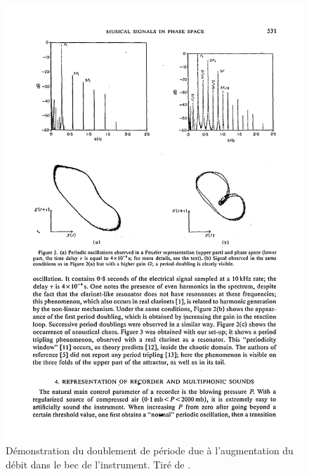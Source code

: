 \documentclass[atiam, article]{rapport} %
\begin{document}
\begin{figure}
    \centering
    \includegraphics[trim=0 10.6cm 0 1.8cm, clip, width=\textwidth]{report/Images/Gibiat_PhaseSpaceMusicalSignals_JSV_1988-p3.pdf}
    \caption{Démonstration du doublement de période due à l'augmentation du débit dans le bec de l'instrument. Tiré de \cite{gibiat_phase_1988}.}
    \label{fig:gibiat-double-period}
\end{figure}

\newpage

 {\hypersetup{hidelinks} \printbibliography }
\end{document}
